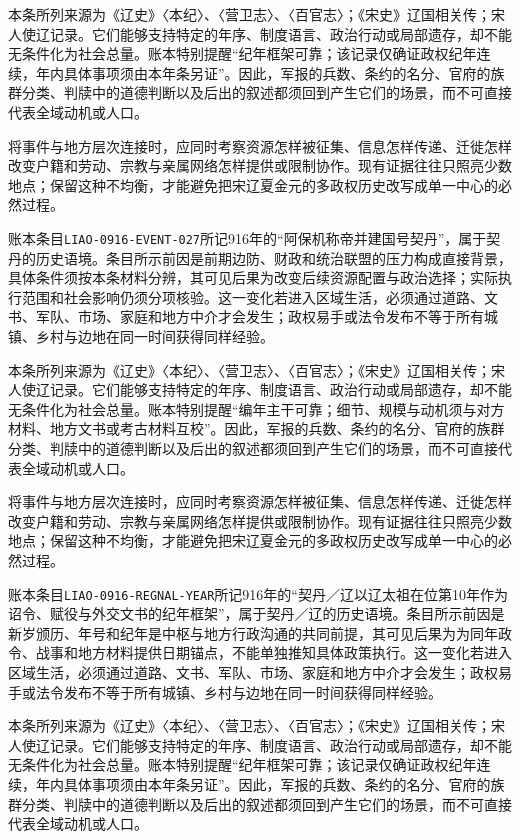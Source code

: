 本条所列来源为《辽史》〈本纪〉、〈营卫志〉、〈百官志〉；《宋史》辽国相关传；宋人使辽记录。它们能够支持特定的年序、制度语言、政治行动或局部遗存，却不能无条件化为社会总量。账本特别提醒“纪年框架可靠；该记录仅确证政权纪年连续，年内具体事项须由本年条另证”。因此，军报的兵数、条约的名分、官府的族群分类、判牍中的道德判断以及后出的叙述都须回到产生它们的场景，而不可直接代表全域动机或人口。

将事件与地方层次连接时，应同时考察资源怎样被征集、信息怎样传递、迁徙怎样改变户籍和劳动、宗教与亲属网络怎样提供或限制协作。现有证据往往只照亮少数地点；保留这种不均衡，才能避免把宋辽夏金元的多政权历史改写成单一中心的必然过程。

账本条目\texttt{LIAO-0916-EVENT-027}所记916年的“阿保机称帝并建国号契丹”，属于契丹的历史语境。条目所示前因是前期边防、财政和统治联盟的压力构成直接背景，具体条件须按本条材料分辨，其可见后果为改变后续资源配置与政治选择；实际执行范围和社会影响仍须分项核验。这一变化若进入区域生活，必须通过道路、文书、军队、市场、家庭和地方中介才会发生；政权易手或法令发布不等于所有城镇、乡村与边地在同一时间获得同样经验。

本条所列来源为《辽史》〈本纪〉、〈营卫志〉、〈百官志〉；《宋史》辽国相关传；宋人使辽记录。它们能够支持特定的年序、制度语言、政治行动或局部遗存，却不能无条件化为社会总量。账本特别提醒“编年主干可靠；细节、规模与动机须与对方材料、地方文书或考古材料互校”。因此，军报的兵数、条约的名分、官府的族群分类、判牍中的道德判断以及后出的叙述都须回到产生它们的场景，而不可直接代表全域动机或人口。

将事件与地方层次连接时，应同时考察资源怎样被征集、信息怎样传递、迁徙怎样改变户籍和劳动、宗教与亲属网络怎样提供或限制协作。现有证据往往只照亮少数地点；保留这种不均衡，才能避免把宋辽夏金元的多政权历史改写成单一中心的必然过程。

账本条目\texttt{LIAO-0916-REGNAL-YEAR}所记916年的“契丹／辽以辽太祖在位第10年作为诏令、赋役与外交文书的纪年框架”，属于契丹／辽的历史语境。条目所示前因是新岁颁历、年号和纪年是中枢与地方行政沟通的共同前提，其可见后果为为同年政令、战事和地方材料提供日期锚点，不能单独推知具体政策执行。这一变化若进入区域生活，必须通过道路、文书、军队、市场、家庭和地方中介才会发生；政权易手或法令发布不等于所有城镇、乡村与边地在同一时间获得同样经验。

本条所列来源为《辽史》〈本纪〉、〈营卫志〉、〈百官志〉；《宋史》辽国相关传；宋人使辽记录。它们能够支持特定的年序、制度语言、政治行动或局部遗存，却不能无条件化为社会总量。账本特别提醒“纪年框架可靠；该记录仅确证政权纪年连续，年内具体事项须由本年条另证”。因此，军报的兵数、条约的名分、官府的族群分类、判牍中的道德判断以及后出的叙述都须回到产生它们的场景，而不可直接代表全域动机或人口。


